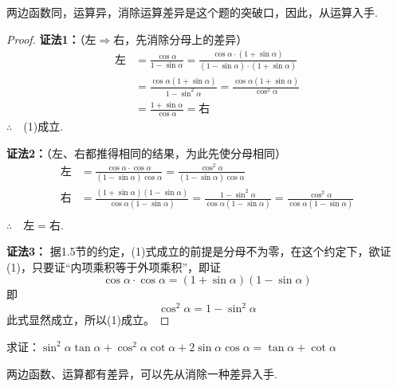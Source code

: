 \begin{analyze}
两边函数同，运算异，消除运算差异是这个题的突破口，因此，从运算入手.
\end{analyze}

\begin{proof}
\textbf{证法1：}（左$\Rightarrow$右，先消除分母上的差异）
\[\begin{split}
\text{左}&=\frac{\cos\alpha}{1-\sin\alpha}=\frac{\cos\alpha\cdot (1+\sin\alpha)}{(1-\sin\alpha)\cdot (1+\sin\alpha)}\\
&=\frac{\cos\alpha(1+\sin\alpha)}{1-\sin^2\alpha}=\frac{\cos\alpha(1+\sin\alpha)}{\cos^2\alpha}\\
&=\frac{1+\sin\alpha}{\cos\alpha}=\text{右}
\end{split}\]
$\therefore\quad $(1)成立.

\textbf{证法2：}（左、右都推得相同的结果，为此先使分母相同）
\[\begin{split}
\text{左}&=\frac{\cos\alpha\cdot \cos\alpha}{(1-\sin\alpha)\cos\alpha}=\frac{\cos^2\alpha}{(1-\sin\alpha)\cos\alpha}\\
\text{右}&=\frac{(1+\sin\alpha) (1-\sin\alpha)}{\cos\alpha(1-\sin\alpha)}=\frac{1-\sin^2\alpha}{\cos\alpha(1-\sin\alpha)}=\frac{\cos^2\alpha}{\cos\alpha(1-\sin\alpha)}\\
\end{split}\]
$\therefore\quad \text{左}=\text{右}$.

\textbf{证法3：} 据1.5节的约定，(1)式成立的前提是分母不为零，在这个约定下，欲证(1)，只要证“内项乘积等于外项乘积”，即证
\begin{equation}
  \cos\alpha\cdot\cos\alpha=(1+\sin\alpha)(1-\sin\alpha)\tag{2}  
\end{equation}
即
\[\cos^2\alpha=1-\sin^2\alpha\]
此式显然成立，所以(1)成立。
\end{proof}


\begin{example}
求证：$\sin^2\alpha\tan\alpha+\cos^2\alpha\cot\alpha+2\sin\alpha\cos\alpha=\tan\alpha+\cot\alpha$
\end{example}

\begin{analyze}
两边函数、运算都有差异，可以先从消除一种差异入手.
\end{analyze}


